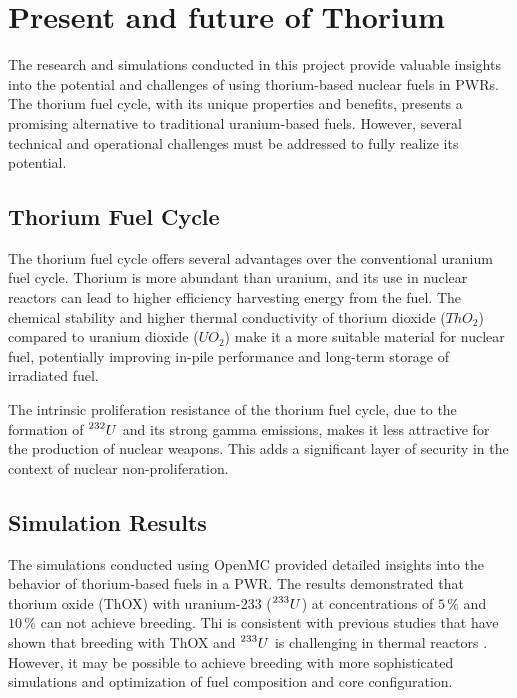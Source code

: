 \chapter{Present and future of Thorium}

The research and simulations conducted in this project provide valuable insights into the potential and challenges of using thorium-based nuclear fuels in PWRs. The thorium fuel cycle, with its unique properties and benefits, presents a promising alternative to traditional uranium-based fuels. However, several technical and operational challenges must be addressed to fully realize its potential.

\section{Thorium Fuel Cycle}

The thorium fuel cycle offers several advantages over the conventional uranium fuel cycle. Thorium is more abundant than uranium, and its use in nuclear reactors can lead to higher efficiency harvesting energy from the fuel. The chemical stability and higher thermal conductivity of thorium dioxide (\(ThO_2\)) compared to uranium dioxide (\(UO_2\)) make it a more suitable material for nuclear fuel, potentially improving in-pile performance and long-term storage of irradiated fuel.

The intrinsic proliferation resistance of the thorium fuel cycle, due to the formation of \(\prescript{232}{}{U}\) and its strong gamma emissions, makes it less attractive for the production of nuclear weapons. This adds a significant layer of security in the context of nuclear non-proliferation.

\section{Simulation Results}

The simulations conducted using OpenMC provided detailed insights into the behavior of thorium-based fuels in a PWR. The results demonstrated that thorium oxide (ThOX) with uranium-233 (\(\prescript{233}{}{U}\)) at concentrations of \(5 \, \%\) and \(10 \, \%\) can not achieve breeding. Thi is consistent with previous studies that have shown that breeding with ThOX and \(\prescript{233}{}{U}\) is challenging in thermal reactors \cite{roadmap}. However, it may be possible to achieve breeding with more sophisticated simulations and optimization of fuel composition and core configuration.


